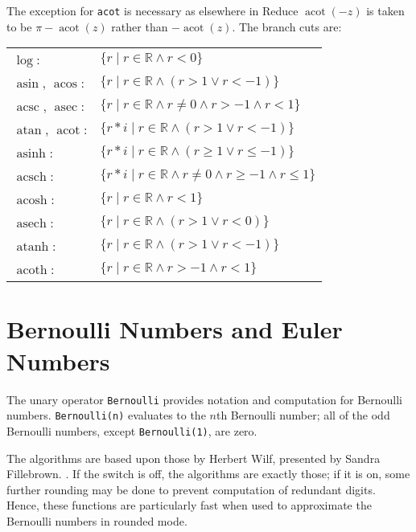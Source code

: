 The exception for \texttt{acot} is necessary as elsewhere in Reduce
$\mathop{\mathrm{acot}}(-z)$ is taken to be $\pi - \mathop{\mathrm{acot}}(z)$
rather than $-\mathop{\mathrm{acot}}(z)$.
The branch cuts are:\\
\begin{tabular}{ll}
  $\log$:           & $ \{r   \mid r \in\mathbb{R} \land r < 0\} $\\
  $\mathop{\mathrm{asin}}$, $\mathop{\mathrm{acos}}$: & $ \{r   \mid r \in\mathbb{R} \land (r > 1 \lor r < -1)\} $\\
  $\mathop{\mathrm{acsc}}$, $\mathop{\mathrm{asec}}$: & $ \{r   \mid r \in\mathbb{R} \land r \neq 0 \land r > -1 \land r < 1\} $\\
  $\mathop{\mathrm{atan}}$, $\mathop{\mathrm{acot}}$: & $ \{r*i \mid r \in\mathbb{R} \land (r > 1 \lor r < -1)\} $\\
  $\mathop{\mathrm{asinh}}$:         & $ \{r*i \mid r \in\mathbb{R} \land (r \geq  1 \lor r \leq  -1)\} $\\
  $\mathop{\mathrm{acsch}}$:         & $ \{r*i \mid r \in\mathbb{R} \land r \neq 0 \land r \geq  -1 \land r \leq  1\} $\\
  $\mathop{\mathrm{acosh}}$:         & $ \{r   \mid r \in\mathbb{R} \land r < 1\} $\\
  $\mathop{\mathrm{asech}}$:         & $ \{r   \mid r \in\mathbb{R} \land (r > 1 \lor r < 0)\} $\\
  $\mathop{\mathrm{atanh}}$:         & $ \{r   \mid r \in\mathbb{R} \land (r > 1 \lor r < -1)\} $\\
  $\mathop{\mathrm{acoth}}$:         & $ \{r   \mid r \in\mathbb{R} \land r > -1 \land r < 1\} $
\end{tabular}

\section{Bernoulli Numbers and Euler Numbers}
\hypertarget{operator:BERNOULLI}{}
\hypertarget{operator:EULER}{}

The unary operator \texttt{Bernoulli} provides notation and computation for
Bernoulli numbers.  \texttt{Bernoulli(n)} evaluates to the $n$th Bernoulli
number; all of the odd Bernoulli numbers, except \texttt{Bernoulli(1)}, are
zero.

The algorithms are based upon those by Herbert Wilf, presented by Sandra
Fillebrown.%
 \cite{Fillebrown:92}.  
If the  switch is off,
the algorithms are exactly those; if it is on, some further rounding may
be done to prevent computation of redundant digits.  Hence, these
functions are particularly fast when used to approximate the Bernoulli
numbers in rounded mode.

